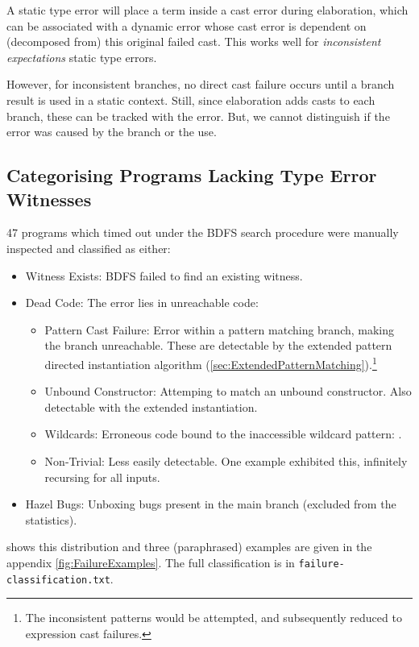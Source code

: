 A static type error will place a term inside a cast error during elaboration, which can be associated with a dynamic error whose cast error is dependent on (decomposed from) this original failed cast. This works well for \textit{inconsistent expectations} static type errors.

However, for inconsistent branches, no direct cast failure occurs until a branch result is used in a static context. Still, since elaboration adds casts to each branch, these can be tracked with the error. But, we cannot distinguish if the error was caused by the branch or the use.
  
\subsection{Categorising Programs Lacking Type Error Witnesses}
47 programs which timed out under the BDFS search procedure were manually inspected and classified as either:
\begin{itemize}
\item Witness Exists: BDFS failed to find an existing witness.
\item Dead Code: The error lies in unreachable code:
\begin{itemize}
\item Pattern Cast Failure: Error within a pattern matching branch, making the branch unreachable. These are detectable by the extended pattern directed instantiation algorithm (\cref{sec:ExtendedPatternMatching}).\footnote{The inconsistent patterns would be attempted, and subsequently reduced to expression cast failures.}
\item Unbound Constructor: Attemping to match an unbound constructor. Also detectable with the extended instantiation.
\item Wildcards: Erroneous code bound to the inaccessible wildcard pattern: .
\item Non-Trivial: Less easily detectable. One example exhibited this, infinitely recursing for all inputs.
\end{itemize}
\item Hazel Bugs: Unboxing bugs present in the main branch (excluded from the statistics).
\end{itemize}
 shows this distribution and three (paraphrased) examples are given in the appendix \cref{fig:FailureExamples}. The full classification is in \texttt{failure-classification.txt}.

